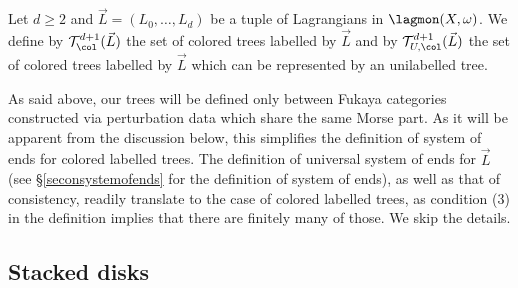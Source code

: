 	Let $d\geq 2$ and $\vec{L}=(L_0,\ldots,L_d)$ be a tuple of Lagrangians in $\lagmon(X,\omega)$. We define by $\mathcal{T}^{d+1}_\col(\vec{L})$ the set of colored trees labelled by $\vec{L}$ and by $\mathcal{T}^{d+1}_{U,\col}(\vec{L})$ the set of colored trees labelled by $\vec{L}$ which can be represented by an unilabelled tree.
	\begin{rem}
		As said above, our trees will be defined only between Fukaya categories constructed via perturbation data which share the same Morse part. As it will be apparent from the discussion below, this simplifies the definition of system of ends for colored labelled trees. The definition of universal system of ends for $\vec{L}$ (see \S \ref{seconsystemofends} for the definition of system of ends), as well as that of consistency, readily translate to the case of colored labelled trees, as condition (3) in the definition implies that there are finitely many of those. We skip the details.
	\end{rem}
	
	
	
	
	\subsection{Stacked disks}\label{stackeddisks}
	
